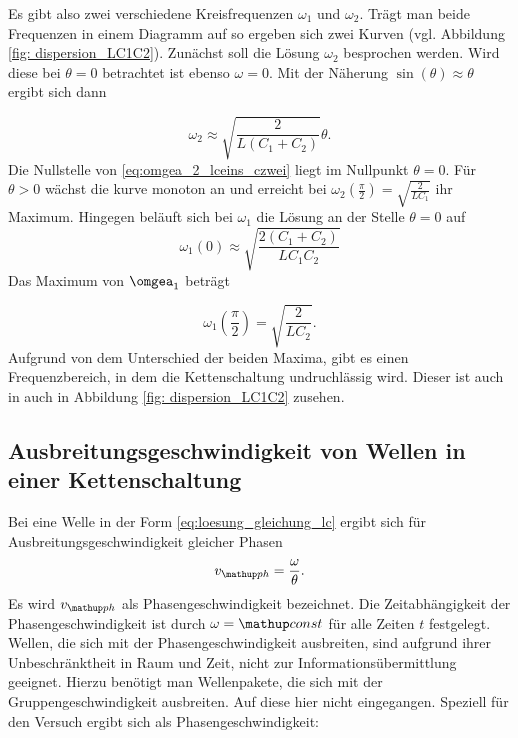 Es gibt also zwei verschiedene Kreisfrequenzen $\omega_1$ und $\omega_2$.
Trägt man beide Frequenzen in einem Diagramm auf so ergeben sich 
zwei Kurven (vgl. Abbildung \ref{fig: dispersion_LC1C2}). 
Zunächst soll die Lösung $\omega_2$ besprochen werden.
Wird diese bei $\theta=0$ betrachtet ist ebenso $\omega=0$.
Mit der Näherung $\sin(\theta)\approx\theta$ ergibt sich dann

\begin{equation}
\label{eq:omgea_2_lceins_czwei}
\omega_2\approx\sqrt{\frac{2}{L\left(C_1+C_2\right)}}\theta.
\end{equation}
Die Nullstelle von \eqref{eq:omgea_2_lceins_czwei} liegt im Nullpunkt $\theta=0$.
Für $\theta>0$ wächst die kurve monoton an und erreicht bei $\omega_2(\frac{\pi}{2})=\sqrt{\frac{2}{LC_1}}$
ihr Maximum. \newline
Hingegen beläuft sich bei $\omega_1$ die Lösung an der Stelle $\theta=0$ auf
\begin{equation*}
\omega_1(0)\approx\sqrt{\frac{2(C_1+C_2)}{LC_1C_2}}
\end{equation*}
Das Maximum von $\omgea_1$ beträgt

\begin{equation}
\label{eq:max_omega_1_ceins_czwei}
\omega_1(\frac{\pi}{2})=\sqrt{\frac{2}{LC_2}}.
\end{equation}
Aufgrund von dem Unterschied der beiden Maxima, gibt es einen Frequenzbereich, in dem
die Kettenschaltung undruchlässig wird. Dieser ist auch in auch in Abbildung \ref{fig: dispersion_LC1C2}
zusehen.

\subsection{Ausbreitungsgeschwindigkeit von Wellen in einer Kettenschaltung}
Bei eine Welle in der Form \eqref{eq:loesung_gleichung_lc}
ergibt sich für Ausbreitungsgeschwindigkeit gleicher Phasen
\begin{equation*}
v\ua{ph}=\frac{\omega}{\theta}.
\end{equation*}
Es wird $v\ua{ph}$ als Phasengeschwindigkeit bezeichnet.
Die Zeitabhängigkeit der Phasengeschwindigkeit ist durch $\omega=\map{const}$ 
für alle Zeiten $t$ festgelegt. Wellen, die sich mit der Phasengeschwindigkeit
ausbreiten, sind aufgrund ihrer Unbeschränktheit in Raum und Zeit, nicht zur
Informationsübermittlung geeignet. Hierzu benötigt man Wellenpakete, die sich 
mit der Gruppengeschwindigkeit ausbreiten. Auf diese hier nicht eingegangen.
Speziell für den Versuch ergibt sich als Phasengeschwindigkeit:

